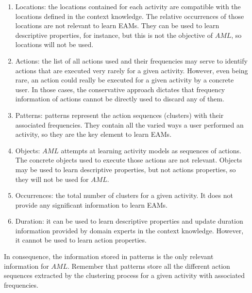 \begin{enumerate}
 \item Locations: the locations contained for each activity are compatible with the locations defined in the context knowledge. The relative occurrences of those locations are not relevant to learn EAMs. They can be used to learn descriptive properties, for instance, but this is not the objective of $AML$, so locations will not be used.
 \item Actions: the list of all actions used and their frequencies may serve to identify actions that are executed very rarely for a given activity. However, even being rare, an action could really be executed for a given activity by a concrete user. In those cases, the conservative approach dictates that frequency information of actions cannot be directly used to discard any of them.
 \item Patterns: patterns represent the action sequences (clusters) with their associated frequencies. They contain all the varied ways a user performed an activity, so they are the key element to learn EAMs.
 \item Objects: $AML$ attempts at learning activity models as sequences of actions. The concrete objects used to execute those actions are not relevant. Objects may be used to learn descriptive properties, but not actions properties, so they will not be used for $AML$.
 \item Occurrences: the total number of clusters for a given activity. It does not provide any significant information to learn EAMs.
 \item Duration: it can be used to learn descriptive properties and update duration information provided by domain experts in the context knowledge. However, it cannot be used to learn action properties.
\end{enumerate}

In consequence, the information stored in patterns is the only relevant information for $AML$. Remember that patterns store all the different action sequences extracted by the clustering process for a given activity with associated frequencies. 

